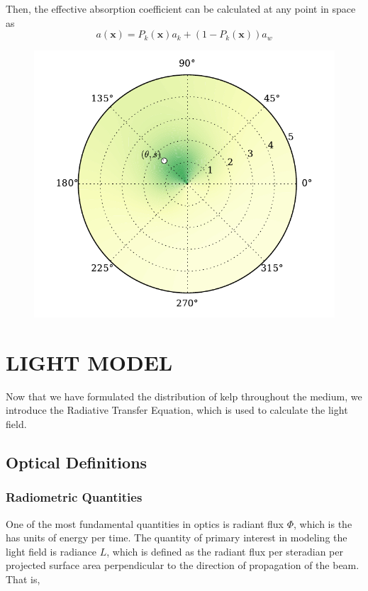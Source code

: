 \documentclass[ms,cpyr,lof,lot]{uathesis}
\renewcommand\vec\bm
\begin{document}
Then, the effective absorption coefficient can be calculated at any point in space as
\begin{equation*}
  a(\vec{x}) = P_k(\vec{x})a_k + (1-P_k(\vec{x}))a_w
\end{equation*}

\begin{figure}[h]
	\centering
	\includegraphics[width=.75\linewidth]{prob_shade}
	\vspace{-2em}
	\label{fig:prob_shade}
\end{figure}
 \chapter{LIGHT MODEL}
\label{chap:light}

Now that we have formulated the distribution of kelp throughout the medium, we introduce the Radiative Transfer Equation, which is used to calculate the light field.

\section{Optical Definitions}

\subsection{Radiometric Quantities}

One of the most fundamental quantities in optics is radiant flux $\Phi$, which is the has units of energy per time.
The quantity of primary interest in modeling the light field is radiance $L$, which is defined as the radiant flux per steradian per projected surface area perpendicular to the direction of propagation of the beam.
That is,
\end{document}
